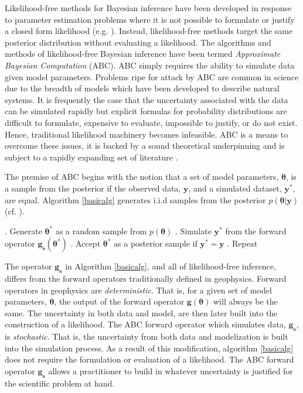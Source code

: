 Likelihood-free methods for Bayesian inference have been developed in response to parameter estimation problems where it is not possible to formulate or justify a closed form likelihood (e.g. \citet{Tavare1997,Fu1997,Weiss1998a,Pritchard1999a,Beaumont2002,Marjoram2003}). Instead, likelihood-free methods target the same posterior distribution without evaluating a likelihood. The algorithms and methods of likelihood-free Bayesian inference have been termed \textit{Approximate Bayesian Computation} (ABC). ABC simply requires the ability to simulate data given model parameters. Problems ripe for attack by ABC are common in science due to the breadth of models which have been developed to describe natural systems. It is frequently the case that the uncertainty associated with the data can be simulated rapidly but explicit formulas for probability distributions are difficult to formulate, expensive to evaluate, impossible to justify, or do not exist. Hence, traditional likelihood machinery becomes infeasible. ABC is a means to overcome these issues, it is backed by a sound theoretical underpinning and is subject to a rapidly expanding set of literature \citep{Ratmann2009,Blum2010,vrugt2013toward,Sunnaker2013,Blum2013,Sadegh2014,Pudlo2015,meeds2015hamiltonian,Lintusaari2016,gutmann2016bayesian,sisson2016handbook,Li2017}. \par

The premise of ABC begins with the notion that a set of model parameters, $\bm{\theta}$, is a sample from the posterior if the observed data, $\bm{y}$, and a simulated dataset, $\bm{y^*}$, are equal. Algorithm \ref{basicalg} generates i.i.d samples from the posterior $p(\bm{\theta}|\bm{y})$ (cf. \citet{Marjoram2003}).

\begin{algorithm}[H]
	\caption{ }
	\begin{algorithmic}
		. Generate $\bm{\theta^*}$ as a random sample from $p(\bm{\theta})$		
		. Simulate $\bm{y^*}$ from the forward operator $\bm{g_s}(\bm{\theta^*})$		
		. Accept $\bm{\theta^*}$ as a posterior sample if $\bm{y^*} = \bm{y}$		
		. Repeat
	\end{algorithmic}
	\label{basicalg}
\end{algorithm}

The operator $\bm{g_s}$ in Algorithm \ref{basicalg}, and all of likelihood-free inference, differs from the forward operators traditionally defined in geophysics. Forward operators in geophysics are \textit{deterministic}. That is, for a given set of model parameters, $\bm{\theta}$, the output of the forward operator $\bm{g}(\bm{\theta})$ will always be the same. The uncertainty in both data and model, are then later built into the construction of a likelihood. The ABC forward operator which simulates data, $\bm{g_s}$, is \textit{stochastic}. That is, the uncertainty from both data and modelization is built into the simulation process. As a result of this modification, algorithm \ref{basicalg} does not require the formulation or evaluation of a likelihood. The ABC forward operator $\bm{g_s}$ allows a practitioner to build in whatever uncertainty is justified for the scientific problem at hand. \par

